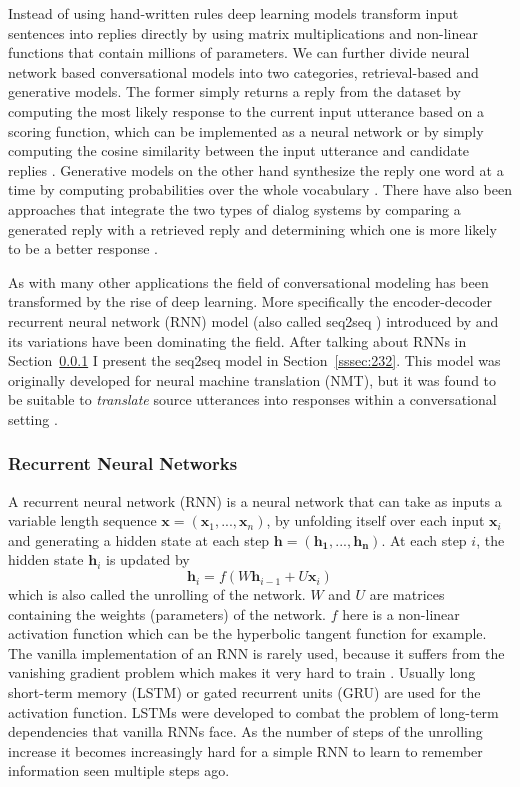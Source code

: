 \documentclass[12pt]{article}
\begin{document}
Instead of using hand-written rules deep learning models transform input sentences into replies directly by using matrix multiplications and non-linear functions that contain millions of parameters. We can further divide neural network based conversational models into two categories, retrieval-based and generative models. The former simply returns a reply from the dataset by computing the most likely response to the current input utterance based on a scoring function, which can be implemented as a neural network \cite{Cho:2014} or by simply computing the cosine similarity between the input utterance and candidate replies \cite{stalemate:2016}. Generative models on the other hand synthesize the reply one word at a time by computing probabilities over the whole vocabulary \cite{Sutskever:2014,Vinyals:2015}. There have also been approaches that integrate the two types of dialog systems by comparing a generated reply with a retrieved reply and determining which one is more likely to be a better response \cite{Song:2016}.

As with many other applications the field of conversational modeling has been transformed by the rise of deep learning. More specifically the encoder-decoder recurrent neural network (RNN) model (also called seq2seq \cite{Sutskever:2014}) introduced by \cite{Cho:2014} and its variations have been dominating the field. After talking about RNNs in Section~\ref{sssec:231} I present the seq2seq model in Section~\ref{sssec:232}. This model was originally developed for neural machine translation (NMT), but it was found to be suitable to \textit{translate} source utterances into responses within a conversational setting \cite{Shang:2015,Vinyals:2015}.

\subsubsection{Recurrent Neural Networks} \label{sssec:231}
A recurrent neural network (RNN) \cite{RNN:1988} is a neural network that can take as inputs a variable length sequence \(\bm{x}=(\bm{x}_1,...,\bm{x}_n)\), by unfolding itself over each input \(\bm{x}_i\) and generating a hidden state at each step \(\bm{h}=(\bm{h_1},...,\bm{h_n})\). At each step \(i\), the hidden state \(\bm{h}_i\) is updated by
\begin{equation} \label{eq231a}
\bm{h}_i=f(W\bm{h}_{i-1}+U\bm{x}_i)
\end{equation}
which is also called the unrolling of the network. \(W\) and \(U\) are matrices containing the weights (parameters) of the network. \(f\) here is a non-linear activation function which can be the hyperbolic tangent function for example. The vanilla implementation of an RNN is rarely used, because it suffers from the vanishing gradient problem which makes it very hard to train \cite{Hochreiter:1998}. Usually long short-term memory (LSTM) \cite{Hochreiter:1997} or gated recurrent units (GRU) \cite{Cho:2014} are used for the activation function. LSTMs were developed to combat the problem of long-term dependencies that vanilla RNNs face. As the number of steps of the unrolling increase it becomes increasingly hard for a simple RNN to learn to remember information seen multiple steps ago. 
\end{document}
